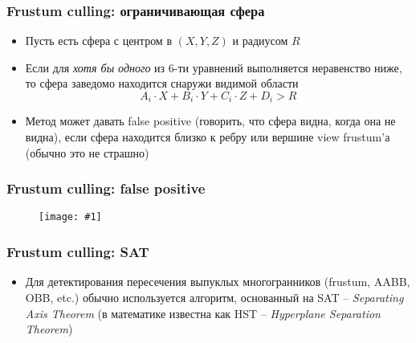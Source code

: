 \documentclass{beamer}
\newcommand{\slideimage}[1]{
  \begin{figure}
    \begin{adjustbox}{width=\textwidth, totalheight=\textheight-2\baselineskip-2\baselineskip,keepaspectratio}
      \texttt{[image: \#1]}
    \end{adjustbox}
  \end{figure}
}
\begin{document}
\begin{frame}[fragile]
\frametitle{Frustum culling: ограничивающая сфера}
\begin{itemize}
\item Пусть есть сфера с центром в \begin{math}(X,Y,Z)\end{math} и радиусом \begin{math}R\end{math}
\pause
\item Если для \textit{хотя бы одного} из 6-ти уравнений выполняется неравенство ниже, то сфера заведомо находится снаружи видимой области
\begin{equation*}
A_i \cdot X + B_i \cdot Y + C_i \cdot Z + D_i > R
\end{equation*}
\pause
\item Метод может давать false positive (говорить, что сфера видна, когда она не видна), если сфера находится близко к ребру или вершине view frustum'а (обычно это не страшно)
\end{itemize}
\end{frame}

\begin{frame}[fragile]
\frametitle{Frustum culling: false positive}
\slideimage{false_positive.jpg}
\end{frame}

\begin{frame}[fragile]
\frametitle{Frustum culling: SAT}
\begin{itemize}
\item Для детектирования пересечения выпуклых многогранников (frustum, AABB, OBB, etc.) обычно используется алгоритм, основанный на SAT -- \textit{Separating Axis Theorem} (в математике известна как HST -- \textit{Hyperplane Separation Theorem})
\end{itemize}
\end{frame}
\end{document}
